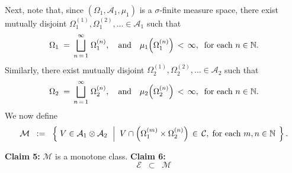 \vskip 0.5cm
\noindent
Next, note that, since $\left(\Omega_{1},\mathcal{A}_{1},\mu_{1}\right)$
is a $\sigma$-finite measure space, there exist mutually disjoint
$\Omega_{1}^{(1)}, \Omega_{1}^{(2)}, \ldots \in \mathcal{A}_{1}$ such that
\begin{equation*}
\Omega_{1} \; = \, \overset{\infty}{\underset{n\,=\,1}{\bigsqcup}}\;\Omega_{1}^{(n)},
\quad\textnormal{and}\quad
\mu_{1}\!\left(\Omega_{1}^{(n)}\right) \,<\, \infty,
\;\;\textnormal{for each $n\in\mathbb{N}$}.
\end{equation*}
Similarly, there exist mutually disjoint 
$\Omega_{2}^{(1)}, \Omega_{2}^{(2)}, \ldots \in \mathcal{A}_{2}$ such that
\begin{equation*}
\Omega_{2} \; = \, \overset{\infty}{\underset{n\,=\,1}{\bigsqcup}}\;\Omega_{2}^{(n)},
\quad\textnormal{and}\quad
\mu_{2}\!\left(\Omega_{2}^{(n)}\right) \,<\, \infty,
\;\;\textnormal{for each $n\in\mathbb{N}$}.
\end{equation*}
We now define
\begin{equation*}
\mathcal{M}
\;\; := \;\;
	\left\{\;
	V \in \mathcal{A}_{1}\otimes\mathcal{A}_{2}
	\;\,\left\vert\;\;
		V\cap\left(\Omega_{1}^{(m)}\times\Omega_{2}^{(n)}\right)
		\,\in\, \mathcal{C},
		\;\textnormal{for each $m, n \in \mathbb{N}$}
	\right.
	\;\right\}.
\end{equation*}
\vskip 0.5cm
\begin{center}
\begin{minipage}{6.5in}
\noindent
\textbf{Claim 5:}\quad
$\mathcal{M}$ is a monotone class.
\vskip 0.5cm
\noindent
\textbf{Claim 6:}\quad
\begin{equation*}
\mathcal{E}
\;\; \subset \;\;\mathcal{M}
\end{equation*}
\end{minipage}
\end{center}


